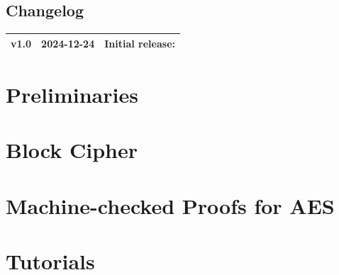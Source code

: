 \documentclass[11pt,openany]{article}
\begin{document}
\vfill
\subsection*{Changelog}
\large
\begin{tabular}{@{} L{0.05\textwidth} L{0.2\textwidth} L{0.7\textwidth} @{}} %
	\toprule
	v1.0 & 2024-12-24 & Initial release: \\%
	\bottomrule
\end{tabular}

\newpage


\tableofcontents
\newpage
\section{Preliminaries}


\newpage
\section{Block Cipher}


\newpage
\section{Machine-checked Proofs for AES}

\newpage
\section{Tutorials}


%
%
%
%
\end{document}
